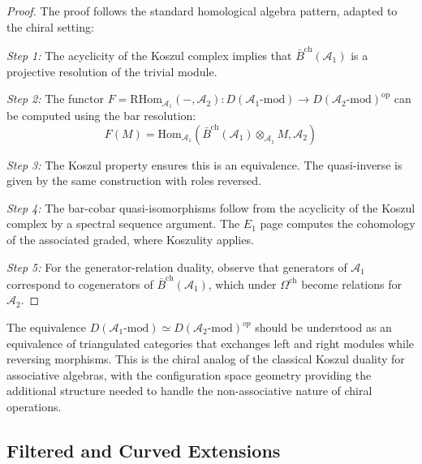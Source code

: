 \begin{proof}
The proof follows the standard homological algebra pattern, adapted to the chiral setting:
 
\emph{Step 1:} The acyclicity of the Koszul complex implies that $\bar{B}^{\text{ch}}(\mathcal{A}_1)$ is a 
projective resolution of the trivial module.
 
\emph{Step 2:} The functor $F = \text{RHom}_{\mathcal{A}_1}(-, \mathcal{A}_2): D(\mathcal{A}_1\text{-mod}) \to 
D(\mathcal{A}_2\text{-mod})^{\text{op}}$ can be computed using the bar resolution:
\[
F(M) = \text{Hom}_{\mathcal{A}_1}(\bar{B}^{\text{ch}}(\mathcal{A}_1) \otimes_{\mathcal{A}_1} M, \mathcal{A}_2)
\]
 
\emph{Step 3:} The Koszul property ensures this is an equivalence. The quasi-inverse is given by the 
same construction with roles reversed.
 
\emph{Step 4:} The bar-cobar quasi-isomorphisms follow from the acyclicity of the Koszul complex by a 
spectral sequence argument. The $E_1$ page computes the cohomology of the associated graded, where 
Koszulity applies.
 
\emph{Step 5:} For the generator-relation duality, observe that generators of $\mathcal{A}_1$ correspond to 
cogenerators of $\bar{B}^{\text{ch}}(\mathcal{A}_1)$, which under $\Omega^{\text{ch}}$ become relations for 
$\mathcal{A}_2$.


\end{proof}
\begin{remark} The equivalence $D(\mathcal{A}_1\text{-mod}) \simeq D(\mathcal{A}_2\text{-mod})^{op}$ should be understood as an equivalence of triangulated categories that exchanges left and right modules while reversing morphisms. This is the chiral analog of the classical Koszul duality for associative algebras, with the configuration space geometry providing the additional structure needed to handle the non-associative nature of chiral operations.
\end{remark}

\subsection{Filtered and Curved Extensions}

